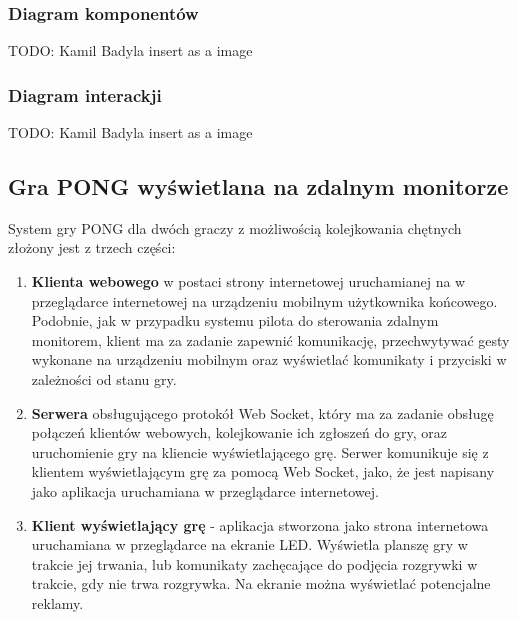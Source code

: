 \subsubsection{Diagram komponentów}

TODO: Kamil Badyla
insert as a image

\subsubsection{Diagram interackji}

TODO: Kamil Badyla
insert as a image

\subsection{Gra PONG wyświetlana na zdalnym monitorze}

System gry PONG dla dwóch graczy z możliwością kolejkowania chętnych złożony jest z trzech części:

\begin{enumerate}
  \item \textbf{Klienta webowego} w postaci strony internetowej uruchamianej na w przeglądarce internetowej na urządzeniu mobilnym użytkownika końcowego. Podobnie, jak w przypadku systemu pilota do sterowania zdalnym monitorem, klient ma za zadanie zapewnić komunikację, przechwytywać gesty wykonane na urządzeniu mobilnym oraz wyświetlać komunikaty i przyciski w zależności od stanu gry.
  \item \textbf{Serwera} obsługującego protokół Web Socket, który ma za zadanie obsługę połączeń klientów webowych, kolejkowanie ich zgłoszeń do gry, oraz uruchomienie gry na kliencie wyświetlającego grę. Serwer komunikuje się z klientem wyświetlającym grę za pomocą Web Socket, jako, że jest napisany jako aplikacja uruchamiana w przeglądarce internetowej.
  \item \textbf{Klient wyświetlający grę} - aplikacja stworzona jako strona internetowa uruchamiana w przeglądarce na ekranie LED. Wyświetla planszę gry w trakcie jej trwania, lub komunikaty zachęcające do podjęcia rozgrywki w trakcie, gdy nie trwa rozgrywka. Na ekranie można wyświetlać potencjalne reklamy.
\end{enumerate}

